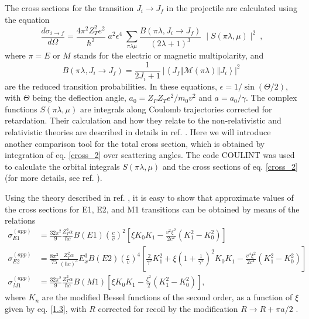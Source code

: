 \documentclass[prc,preprint,showpacs,showkeys,nofootinbib]{revtex4}%
\begin{document}
The cross sections for the transition $J_{i}\rightarrow J_{f}$ in
the projectile are calculated using the equation  \cite{Ber03}
\begin{equation}
{\frac{d\sigma_{i\rightarrow f}}{d\Omega}}=\frac{4\pi^{2}Z_{T}^{2}e^{2}}%
{\hbar^{2}}\;a^{2}\epsilon^{4}\;\sum_{\pi\lambda\mu}{\dfrac{B(\pi\lambda
,J_{i}\rightarrow J_{f})}{(2\lambda+1)^{3}}}\;\mid S(\pi\lambda,\mu)\mid
^{2}\ , \label{cross_2}%
\end{equation}
where $\pi=E$ or $M$ stands for the electric or magnetic multipolarity, and
\begin{equation}
B(\pi\lambda,J_{i}\longrightarrow J_{f})=\frac{1}{2J_{i}+1}\ \left\vert
\left\langle J_{f}\left\Vert \mathbf{\mathcal{M}}(\pi\lambda)\right\Vert
J_{i}\right\rangle \right\vert ^{2}\ \label{reduced}%
\end{equation}
are the reduced transition probabilities. In these equations, $\epsilon
=1/\sin(\Theta/2)$, with $\Theta$ being the deflection angle, $a_{0}%
={Z_{P}Z_{T}e^{2}/}m_{0}v^{2}$ and $a=a_{0}/\gamma$. The complex
functions $S(\pi\lambda,\mu)$ are integrals along Coulomb
trajectories corrected for retardation. Their calculation and how
they relate to the non-relativistic and relativistic theories are
described in details in ref. \cite{Ber03}. Here we will introduce
another comparison tool for the total cross section, which is
obtained by integration of eq. \ref{cross_2} over scattering angles.
The code COULINT \cite{Ber03} was used to calculate the orbital
integrals $S(\pi\lambda,\mu)$ and the cross sections of eq.
\ref{cross_2} (for more details, see ref. \cite{Ber03}).

Using the theory described in ref. \cite{BB85}, it is easy to show that
approximate values of the cross sections for E1, E2, and M1 transitions can be
obtained by means of the relations%
\begin{align}
\sigma_{E1}^{(app)}  &  =\frac{32\pi^{2}}{9}\frac{Z_{T}^{2}\alpha}{\hbar
c}B\left(  E1\right)  \left(  \frac{c}{v}\right)  ^{2}\left[  \xi K_{0}%
K_{1}-\frac{v^{2}\xi^{2}}{2c^{2}}\left(  K_{1}^{2}-K_{0}^{2}\right)  \right]
\nonumber\\
\sigma_{E2}^{(app)}  &  =\frac{8\pi^{2}}{75}\frac{Z_{T}^{2}\alpha}{\left(
\hbar c\right)  ^{3}}E_{x}^{3}B\left(  E2\right)  \left(  \frac{c}{v}\right)
^{4}\left[  \frac{2}{\gamma^{2}}K_{1}^{2}+\xi\left(  1+\frac{1}{\gamma^{2}%
}\right)  ^{2}K_{0}K_{1}-\frac{v^{4}\xi^{2}}{2c^{4}}\left(  K_{1}^{2}%
-K_{0}^{2}\right)  \right] \nonumber\\
\sigma_{M1}^{(app)}  &  =\frac{32\pi^{2}}{9}\frac{Z_{T}^{2}\alpha}{\hbar
c}B\left(  M1\right)  \left[  \xi K_{0}K_{1}-\frac{\xi^{2}}{2}\left(
K_{1}^{2}-K_{0}^{2}\right)  \right]  , \label{approx}%
\end{align}
where $K_{n}$ are the modified Bessel functions of the second order, as a
function of $\xi$ given by eq. \ref{1.3}, with $R$ corrected for recoil by the
modification $R\rightarrow R+\pi a/2$ \cite{WA79}.
\end{document}
